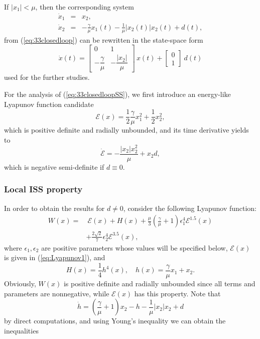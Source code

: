 \documentclass[letterpaper, 10 pt, conference]{ieeeconf}  %
\begin{document}
\label{sec:33:sub:2}

If $|x_{1}|<\mu$, then the corresponding system 
\begin{eqnarray*}
\dot{x}_{1} & = & x_{2},\\
\dot{x}_{2} & = & -\frac{\gamma}{\mu}x_{1}(t)-\frac{1}{\mu}\bigl|x_{2}(t)\bigr|x_{2}(t)+d(t),
\end{eqnarray*}
from (\ref{eq:33closedloop}) can be rewritten in the state-space
form 
\begin{equation}
\dot{x}(t)=\left[\begin{array}{cc}
0 & 1\\
-\dfrac{\gamma}{\mu} & -\dfrac{|x_{2}|}{\mu}
\end{array}\right]\,x(t)+\left[\begin{array}{c}
0\\[1mm]
1
\end{array}\right]\ d(t)\label{eq:33closedloopSS}
\end{equation}
used for the further studies.

For the analysis of (\ref{eq:33closedloopSS}), we first introduce
an energy-like Lyapunov function candidate 
\begin{equation}
\mathcal{E}(x)=\frac{1}{2}\frac{\gamma}{\mu}x_{1}^{2}+\frac{1}{2}x_{2}^{2},\label{eq:Lyapunov1}
\end{equation}
which is positive definite and radially unbounded, and its time derivative
yields to 
\begin{equation}
\dot{\mathcal{E}}=-\frac{|x_{2}|x_{2}^{2}}{\mu}+x_{2}d,\label{eq:dLyapunov1}
\end{equation}
which is negative semi-definite if $d\equiv0$.

\subsubsection{Local ISS property}

In order to obtain the results for $d\ne0$, consider the following
Lyapunov function:
\begin{equation}
\begin{aligned}
W(x)= & \: \mathcal{E}(x)+H(x)+\frac{\mu}{3}\left(\frac{\gamma}{\mu}+1\right)\epsilon_{1}^{4}\mathcal{E}^{1.5}(x) \\
& +\frac{2\sqrt{2}}{7}\epsilon_{2}^{4}\mathcal{E}^{3.5}(x),\label{eq:Lyapunov2}
\end{aligned}
\end{equation}
where $\epsilon_{1},\epsilon_{2}$ are positive parameters whose values
will be specified below, $\mathcal{E}(x)$ is given in (\ref{eq:Lyapunov1}),
and 
\[
H(x)=\frac{1}{4}h^{4}(x), \quad h(x)=\frac{\gamma}{\mu}x_{1}+x_{2}.
\]
Obviously, $W(x)$ is positive definite and radially unbounded since
all terms and parameters are nonnegative, while $\mathcal{E}(x)$
has this property. Note that
\[
\dot{h}=\left(\frac{\gamma}{\mu}+1\right)x_{2}-h-\frac{1}{\mu}|x_{2}|x_{2}+d
\]
by direct computations, and using Young's inequality we can obtain
the inequalities
\end{document}
